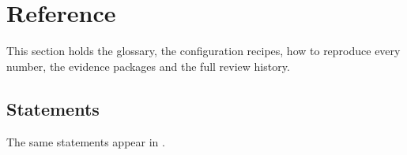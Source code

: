 \section{Reference}\label{sec:h}

This section holds the glossary, the configuration recipes, how to reproduce every number, the evidence packages and
the full review history.









\subsection{Statements}\label{sec:hstatements}
The same statements appear in \mainpaper{}.


